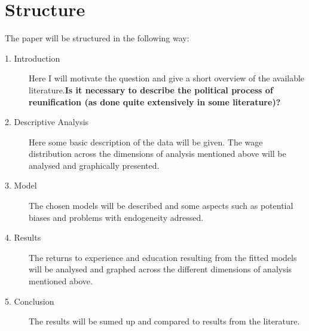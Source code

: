 \documentclass{article}
\begin{document}
\section{Structure}
The paper will be structured in the following way:
\begin{description}
\item[1. Introduction] Here I will motivate the question and give a short overview of the available literature.\textbf{Is it necessary to describe the political process of reunification (as done quite extensively in some literature)?}
\item[2. Descriptive Analysis]
Here some basic description of the data will be given. The wage distribution across the dimensions of analysis mentioned above will be analysed and graphically presented.
\item[3. Model]
The chosen models will be described and some aspects such as potential biases and problems with endogeneity adressed. 
\item[4. Results]
The returns to experience and education resulting from the fitted models will be analysed and graphed across the different dimensions of analysis mentioned above. 
\item[5. Conclusion] The results will be sumed up and compared to results from the literature. 

\end{description}


\end{document}
